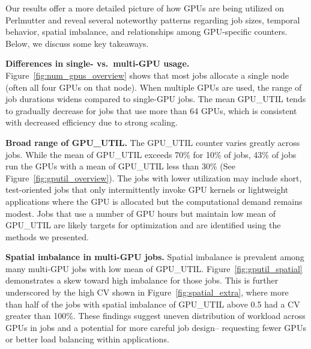 Our results offer a more detailed picture of how GPUs are being utilized on
Perlmutter and reveal several noteworthy patterns regarding job sizes, temporal
behavior, spatial imbalance, and relationships among GPU-specific counters.
Below, we discuss some key takeaways.

\vspace{0.08in}
\noindent\textbf{Differences in single- vs.~multi-GPU usage.}
Figure~\ref{fig:num_gpus_overview} shows that most jobs allocate a single node
(often all four GPUs on that node).
When multiple GPUs are used, the range of job
durations widens compared to single-GPU jobs.
The mean GPU\_UTIL tends to gradually decrease for jobs that use more than
64 GPUs, which is consistent with decreased efficiency due to strong scaling.

\vspace{0.08in}
\noindent\textbf{Broad range of GPU\_UTIL.}
The GPU\_UTIL counter varies greatly across jobs.
While the mean of GPU\_UTIL exceeds 70\% for 10\% of jobs,
43\% of jobs run the GPUs with a mean of GPU\_UTIL less than 30\%
(See Figure~\ref{fig:gputil_overview}). The jobs with lower utilization may include
short, test-oriented jobs that only intermittently
invoke GPU kernels or lightweight applications where the GPU is allocated but
the computational demand remains modest.
Jobs that use a number of GPU hours but maintain low mean of GPU\_UTIL
are likely targets for optimization
and are identified using the methods we presented.


\vspace{0.08in}
\noindent\textbf{Spatial imbalance in multi-GPU jobs.} Spatial imbalance is
prevalent among many multi-GPU jobs with low mean of GPU\_UTIL.
Figure~\ref{fig:gputil_spatial} demonstrates a skew toward high imbalance for
those jobs. This is further underscored by the high CV shown in
Figure~\ref{fig:spatial_extra}, where more than half of the jobs with spatial
imbalance of GPU\_UTIL above 0.5 had a CV greater than 100\%. These findings
suggest uneven distribution of workload across GPUs in jobs and a potential for
more careful job design-- requesting fewer GPUs or better load balancing within
applications.

